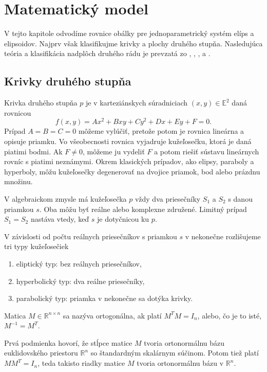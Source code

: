 \chapter{Matematický model}
\label{kap:matematicky_model}
V tejto kapitole odvodíme rovnice obálky pre jednoparametrický systém elíps a elipsoidov. Najprv však klasifikujme krivky a plochy druhého stupňa. Nasledujúca teória a klasifikácia nadplôch druhého rádu je prevzatá zo \cite{Ivan}, \cite{Kor13}, \cite{Gla16}, \cite{Ode20} a \cite{Zla11}.
\section{Krivky druhého stupňa}
Krivka druhého stupňa $p$ je v karteziánskych súradniciach $(x, y) \in \mathbb{E}^2$ daná rovnicou 
$$ f(x, y) = Ax^2 + Bxy + Cy^2 + Dx + Ey + F = 0.$$
Prípad $A = B = C = 0$  môžeme vylúčiť, pretože potom je rovnica lineárna a opisuje priamku. Vo všeobecnosti rovnica vyjadruje kužeľosečku, ktorá je daná piatimi bodmi. Ak $F \neq 0$, môžeme ju vydeliť $F$ a potom riešiť sústavu lineárnych rovníc s piatimi neznámymi. Okrem klasických prípadov, ako elipsy, paraboly a hyperboly, môžu kužeľosečky degenerovať na dvojice priamok, bod alebo prázdnu množinu.

V algebraickom zmysle má kužeľosečka $p$ vždy dva priesečníky $S_1$ a $S_2$ s danou priamkou $s$. Oba môžu byť reálne alebo komplexne združené. Limitný prípad $S_1 = S_2$ nastáva vtedy, keď $s$ je dotyčnicou ku $p$.

V závislosti od počtu reálnych priesečníkov s priamkou $s$ v nekonečne rozlišujeme tri typy kužeľosečiek 
\begin{enumerate}
\item eliptický typ: bez reálnych priesečníkov,
\item hyperbolický typ: dva reálne priesečníky,
\item parabolický typ: priamka v nekonečne sa dotýka krivky.
\end{enumerate}

\begin{definition}
Matica $M \in \mathbb{R}^{n \times n}$ sa nazýva ortogonálna, ak platí $M^T M = I_n$, alebo, čo je to isté, $M^{-1} = M^T$. 
\end{definition}
Prvá podmienka hovorí, že stĺpce matice $M$ tvoria ortonormálnu bázu euklidovského priestoru $\mathbb{R}^n$ so štandardným skalárnym súčinom. Potom tiež platí $MM^T = I_n$, teda takisto riadky matice $M$ tvoria ortonormálnu bázu v $\mathbb{R}^n$. 

